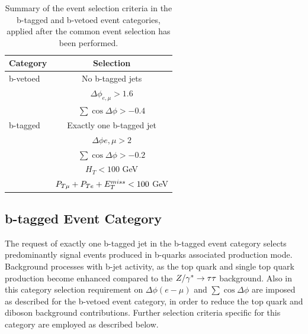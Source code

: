 \begin{table}[t]
  \begin{center}
    \begin{tabular}{p{4cm}c}
      \hline \hline
      Category & Selection \\ [3pt]
      \hline
      b-vetoed &  No b-tagged jets \\	
      & $\Delta\phi_{e,\mu}>1.6$ \\
      & $\sum\cos\Delta\phi > -0.4$ \\[5pt]
      \hline
      b-tagged & Exactly one b-tagged  jet \\
      & $\Delta\phi{e,\mu}>2$ \\
      & $\sum\cos\Delta\phi > -0.2$ \\
      & $ H_T < 100$ GeV \\
      & $P_{T\mu} + P_{Te} + E_{T}^{miss} < 100$ GeV \\[3pt]
      \hline \hline
    \end{tabular}
    \caption{Summary of the event selection criteria in the b-tagged and b-vetoed event categories, applied after the common 
	event selection has been performed.}
    \label{tab:sel}
  \end{center}
\end{table}

\subsection{b-tagged Event Category}\label{sec:tag}
The request of exactly one b-tagged jet in the b-tagged event category selects predominantly signal events produced 
in  b-quarks associated production mode.
Background processes with b-jet activity, as the top quark and single top quark production become enhanced compared to the $Z/\gamma^*\rightarrow \tau\tau$ background.
Also in this category selection requirement on $\Delta\phi(e-\mu)$ and $\sum\cos\Delta\phi$  are imposed as described for the b-vetoed event category,
in order to reduce the top quark and diboson background contributions. Further selection criteria specific for  this category
are employed  as described below.

